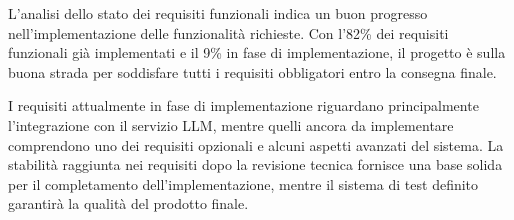 \documentclass[10pt]{article}
\begin{document}
L'analisi dello stato dei requisiti funzionali indica un buon progresso nell'implementazione delle funzionalità richieste. Con l'82\% dei requisiti funzionali già implementati e il 9\% in fase di implementazione, il progetto è sulla buona strada per soddisfare tutti i requisiti obbligatori entro la consegna finale.

I requisiti attualmente in fase di implementazione riguardano principalmente l'integrazione con il servizio LLM, mentre quelli ancora da implementare comprendono uno dei requisiti opzionali e alcuni aspetti avanzati del sistema. La stabilità raggiunta nei requisiti dopo la revisione tecnica fornisce una base solida per il completamento dell'implementazione, mentre il sistema di test definito garantirà la qualità del prodotto finale.
\end{document}
